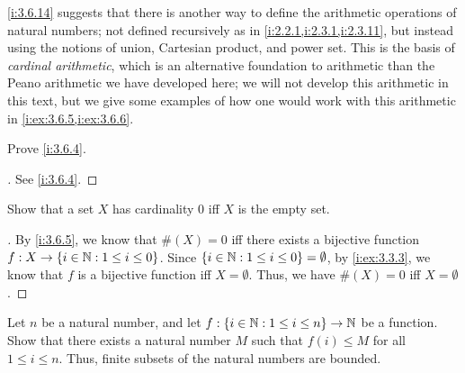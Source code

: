 \begin{rmk}\label{i:3.6.15}
  \cref{i:3.6.14} suggests that there is another way to define the arithmetic operations of natural numbers;
  not defined recursively as in \cref{i:2.2.1,i:2.3.1,i:2.3.11}, but instead using the notions of union, Cartesian product, and power set.
  This is the basis of \emph{cardinal arithmetic}, which is an alternative foundation to arithmetic than the Peano arithmetic we have developed here;
  we will not develop this arithmetic in this text, but we give some examples of how one would work with this arithmetic in \cref{i:ex:3.6.5,i:ex:3.6.6}.
\end{rmk}

\exercisesection

\begin{ex}\label{i:ex:3.6.1}
  Prove \cref{i:3.6.4}.
\end{ex}

\begin{proof}[]
  See \cref{i:3.6.4}.
\end{proof}

\begin{ex}\label{i:ex:3.6.2}
  Show that a set \(X\) has cardinality \(0\) iff \(X\) is the empty set.
\end{ex}

\begin{proof}[]
  By \cref{i:3.6.5}, we know that \(\#(X) = 0\) iff there exists a bijective function \(f : X \to \left\lbrace i \in \mathbb{N} : 1 \leq i \leq 0\right\rbrace\).
  Since \(\left\lbrace i \in \mathbb{N} : 1 \leq i \leq 0\right\rbrace = \emptyset\), by \cref{i:ex:3.3.3}, we know that \(f\) is a bijective function iff \(X = \emptyset\).
  Thus, we have \(\#(X) = 0\) iff \(X = \emptyset\).
\end{proof}

\begin{ex}\label{i:ex:3.6.3}
  Let \(n\) be a natural number, and let \(f : \left\lbrace i \in \mathbb{N} : 1 \leq i \leq n\right\rbrace \to \mathbb{N}\) be a function.
  Show that there exists a natural number \(M\) such that \(f(i) \leq M\) for all \(1 \leq i \leq n\).
  Thus, finite subsets of the natural numbers are bounded.
\end{ex}

